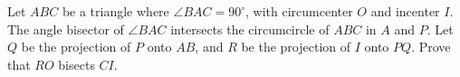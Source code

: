 Let $ABC$ be a triangle where $\angle BAC = 90^{\circ}$, with circumcenter $O$ and incenter $I$.
The angle bisector of $\angle BAC$ intersects the circumcircle of $ABC$ in $A$ and $P$.
Let $Q$ be the projection of $P$ onto $AB$, and $R$ be the projection of $I$ onto $PQ$.
Prove that $RO$ bisects $CI$.
